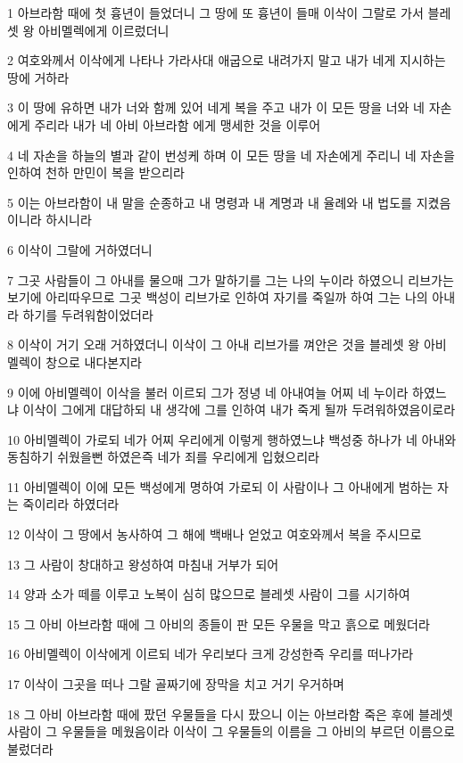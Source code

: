 \par 1 아브라함 때에 첫 흉년이 들었더니 그 땅에 또 흉년이 들매 이삭이 그랄로 가서 블레셋 왕 아비멜렉에게 이르렀더니
\par 2 여호와께서 이삭에게 나타나 가라사대 애굽으로 내려가지 말고 내가 네게 지시하는 땅에 거하라
\par 3 이 땅에 유하면 내가 너와 함께 있어 네게 복을 주고 내가 이 모든 땅을 너와 네 자손에게 주리라 내가 네 아비 아브라함 에게 맹세한 것을 이루어
\par 4 네 자손을 하늘의 별과 같이 번성케 하며 이 모든 땅을 네 자손에게 주리니 네 자손을 인하여 천하 만민이 복을 받으리라
\par 5 이는 아브라함이 내 말을 순종하고 내 명령과 내 계명과 내 율례와 내 법도를 지켰음이니라 하시니라
\par 6 이삭이 그랄에 거하였더니
\par 7 그곳 사람들이 그 아내를 물으매 그가 말하기를 그는 나의 누이라 하였으니 리브가는 보기에 아리따우므로 그곳 백성이 리브가로 인하여 자기를 죽일까 하여 그는 나의 아내라 하기를 두려워함이었더라
\par 8 이삭이 거기 오래 거하였더니 이삭이 그 아내 리브가를 껴안은 것을 블레셋 왕 아비멜렉이 창으로 내다본지라
\par 9 이에 아비멜렉이 이삭을 불러 이르되 그가 정녕 네 아내여늘 어찌 네 누이라 하였느냐 이삭이 그에게 대답하되 내 생각에 그를 인하여 내가 죽게 될까 두려워하였음이로라
\par 10 아비멜렉이 가로되 네가 어찌 우리에게 이렇게 행하였느냐 백성중 하나가 네 아내와 동침하기 쉬웠을뻔 하였은즉 네가 죄를 우리에게 입혔으리라
\par 11 아비멜렉이 이에 모든 백성에게 명하여 가로되 이 사람이나 그 아내에게 범하는 자는 죽이리라 하였더라
\par 12 이삭이 그 땅에서 농사하여 그 해에 백배나 얻었고 여호와께서 복을 주시므로
\par 13 그 사람이 창대하고 왕성하여 마침내 거부가 되어
\par 14 양과 소가 떼를 이루고 노복이 심히 많으므로 블레셋 사람이 그를 시기하여
\par 15 그 아비 아브라함 때에 그 아비의 종들이 판 모든 우물을 막고 흙으로 메웠더라
\par 16 아비멜렉이 이삭에게 이르되 네가 우리보다 크게 강성한즉 우리를 떠나가라
\par 17 이삭이 그곳을 떠나 그랄 골짜기에 장막을 치고 거기 우거하며
\par 18 그 아비 아브라함 때에 팠던 우물들을 다시 팠으니 이는 아브라함 죽은 후에 블레셋 사람이 그 우물들을 메웠음이라 이삭이 그 우물들의 이름을 그 아비의 부르던 이름으로 불렀더라
